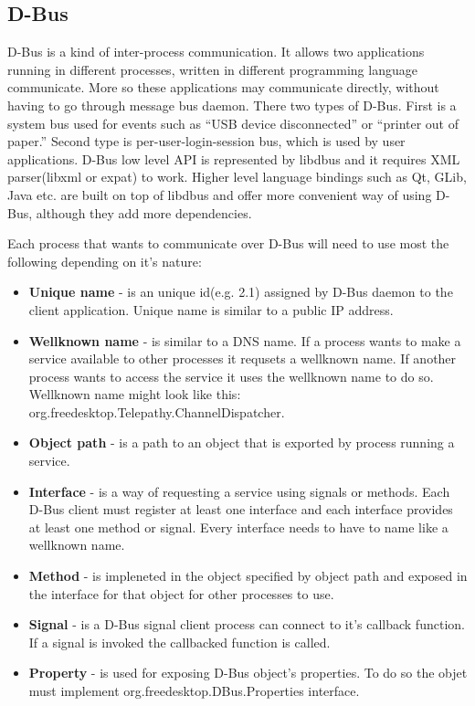 \subsection*{D-Bus}
D-Bus is a kind of inter-process communication. It allows two applications running in different processes, written in different programming language communicate. More so these applications may communicate directly, without having to go through message bus daemon. There two types of D-Bus. First is a system bus used for events such as ``USB device disconnected'' or ``printer out of paper.'' Second type is per-user-login-session bus, which is used by user applications. D-Bus low level API is represented by libdbus and it requires XML parser(libxml or expat) to work. Higher level language bindings such as Qt, GLib, Java etc. are built on top of libdbus and offer more convenient way of using D-Bus, although they add more dependencies.\cite{dbus}\cite{dbusTP} 

Each process that wants to communicate over D-Bus will need to use most the following depending on it's nature: 
\begin{itemize}
	\item {\bf Unique name} - is an unique id(e.g. 2.1) assigned by D-Bus daemon to the client application. Unique name is similar to a public IP address.
	\item {\bf Wellknown name} - is similar to a DNS name. If a process wants to make a service available to other processes it requsets a wellknown name. If another process wants to access the service it uses the wellknown name to do so. Wellknown name might look like this: org.freedesktop.Telepathy.ChannelDispatcher.    
	\item {\bf Object path} - is a path to an object that is exported by process running a service.
	\item {\bf Interface} - is a way of requesting a service using signals or methods. Each D-Bus client must register at least one interface and each interface provides at least one method or signal. Every interface needs to have to name like a wellknown name.  
	\item {\bf Method} - is impleneted in the object specified by object path and exposed in the interface for that object for other processes to use. 
	\item {\bf Signal} - is a D-Bus signal client process can connect to it's callback function. If a signal is invoked the callbacked function is called.
	\item {\bf Property} - is used for exposing D-Bus object's properties. To do so the objet must implement org.freedesktop.DBus.Properties interface.
\end{itemize}

